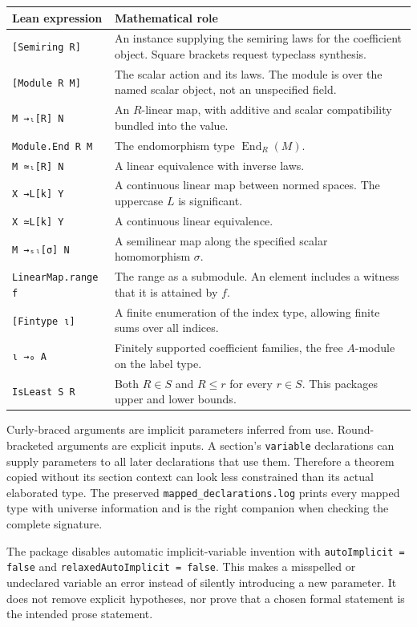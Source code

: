 \documentclass[11pt,a4paper]{article}
\newcommand{\code}[1]{\nolinkurl{#1}}
\begin{document}
\begin{longtable}{p{}p{}}
\toprule Lean expression & Mathematical role \\\midrule\endhead
\code{[Semiring R]} & An instance supplying the semiring laws for the coefficient object. Square brackets request typeclass synthesis. \\
\code{[Module R M]} & The scalar action and its laws. The module is over the named scalar object, not an unspecified field. \\
\code{M →ₗ[R] N} & An $R$-linear map, with additive and scalar compatibility bundled into the value. \\
\code{Module.End R M} & The endomorphism type $\operatorname{End}_R(M)$. \\
\code{M ≃ₗ[R] N} & A linear equivalence with inverse laws. \\
\code{X →L[k] Y} & A continuous linear map between normed spaces. The uppercase $L$ is significant. \\
\code{X ≃L[k] Y} & A continuous linear equivalence. \\
\code{M →ₛₗ[σ] N} & A semilinear map along the specified scalar homomorphism $\sigma$. \\
\code{LinearMap.range f} & The range as a submodule. An element includes a witness that it is attained by $f$. \\
\code{[Fintype ι]} & A finite enumeration of the index type, allowing finite sums over all indices. \\
\code{ι →₀ A} & Finitely supported coefficient families, the free $A$-module on the label type. \\
\code{IsLeast S R} & Both $R\in S$ and $R\leq r$ for every $r\in S$. This packages upper and lower bounds. \\
\bottomrule
\end{longtable}

Curly-braced arguments are implicit parameters inferred from use. Round-bracketed arguments are explicit inputs. A section's \code{variable} declarations can supply parameters to all later declarations that use them. Therefore a theorem copied without its section context can look less constrained than its actual elaborated type. The preserved \code{mapped_declarations.log} prints every mapped type with universe information and is the right companion when checking the complete signature.

The package disables automatic implicit-variable invention with \code{autoImplicit = false} and \code{relaxedAutoImplicit = false}. This makes a misspelled or undeclared variable an error instead of silently introducing a new parameter. It does not remove explicit hypotheses, nor prove that a chosen formal statement is the intended prose statement.
\end{document}
